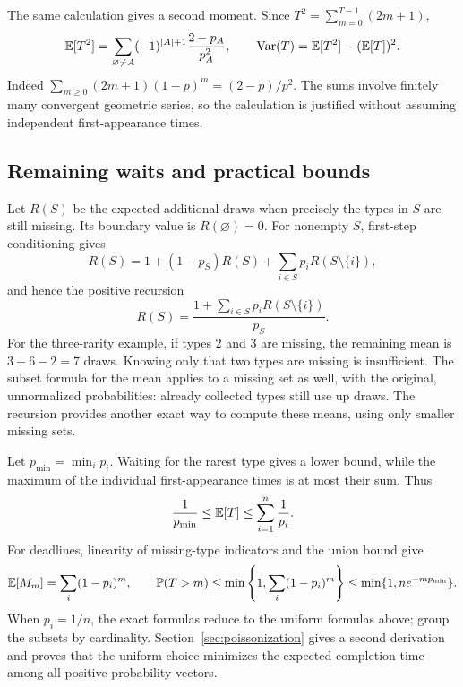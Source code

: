 The same calculation gives a second moment. Since
$T^2=\sum_{m=0}^{T-1}(2m+1)$,
\[
\mathbb E[T^2]=\sum_{\varnothing\ne A}(-1)^{|A|+1}
\frac{2-p_A}{p_A^2},\qquad
\operatorname{Var}(T)=\mathbb E[T^2]-(\mathbb E[T])^2.
\]
Indeed $\sum_{m\ge0}(2m+1)(1-p)^m=(2-p)/p^2$.
The sums involve finitely many convergent geometric series, so the
calculation is justified without assuming independent first-appearance times.

\subsection{Remaining waits and practical bounds}

Let $R(S)$ be the expected additional draws when precisely the types
in $S$ are still missing. Its boundary value is $R(\varnothing)=0$.
For nonempty $S$, first-step conditioning gives
\[
R(S)=1+(1-p_S)R(S)+\sum_{i\in S}p_iR(S\setminus\{i\}),
\]
and hence the positive recursion
\[
\boxed{R(S)=\frac{1+\sum_{i\in S}p_iR(S\setminus\{i\})}{p_S}.}
\]
For the three-rarity example, if types 2 and 3 are missing, the remaining
mean is $3+6-2=7$ draws. Knowing only that two types are missing is
insufficient. The subset formula for the mean applies to a missing set
as well, with the original, unnormalized probabilities: already collected
types still use up draws. The recursion provides another exact way to
compute these means, using only smaller missing sets.

Let $p_{\min}=\min_i p_i$. Waiting for the rarest type gives a lower
bound, while the maximum of the individual first-appearance times is
at most their sum. Thus
\[
\frac1{p_{\min}}\le\mathbb E[T]\le\sum_{i=1}^n\frac1{p_i}.
\]
For deadlines, linearity of missing-type indicators and the union bound give
\[
\mathbb E[M_m]=\sum_i(1-p_i)^m,\qquad
\mathbb P(T>m)\le\min\left\{1,\sum_i(1-p_i)^m\right\}
\le\min\{1,ne^{-mp_{\min}}\}.
\]
When $p_i=1/n$, the exact formulas reduce to the uniform formulas above;
group the subsets by cardinality. Section~\ref{sec:poissonization} gives
a second derivation and proves that the uniform choice minimizes the
expected completion time among all positive probability vectors.

